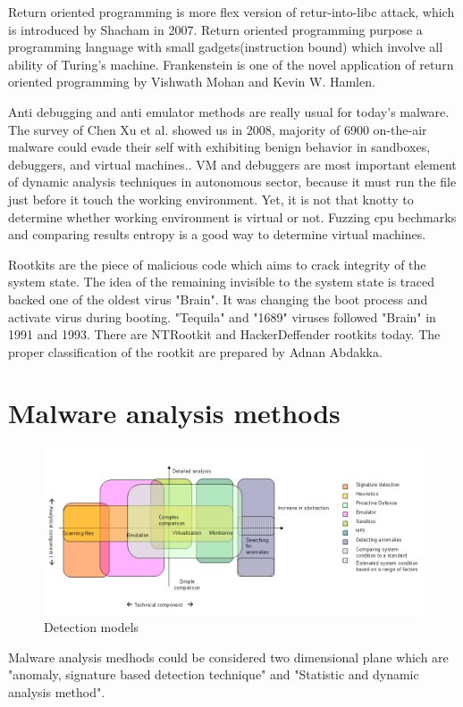 \documentclass[informationsecurity]{gucmasterproject}
\begin{document}
Return oriented programming is more flex version of retur-into-libc attack, which is introduced by Shacham in 2007\cite{shacham2007geometry}. Return oriented programming purpose a programming language with small gadgets(instruction bound) which involve all ability of Turing's machine\cite{roemer2012return}. Frankenstein is one of the novel application of return oriented programming by Vishwath Mohan and Kevin W. Hamlen\cite{mohan2012frankenstein}.

Anti debugging and anti emulator methods are really usual for today's malware. The survey of Chen Xu et al. showed us in 2008, majority of 6900 on-the-air malware could evade their self with exhibiting benign behavior in sandboxes, debuggers, and virtual machines.\cite{chen2008towards}. VM and debuggers are most important element of dynamic analysis techniques in autonomous sector, because it must run the file just before it touch the working environment. Yet, it is not that knotty to determine whether working environment is virtual or not. Fuzzing cpu bechmarks and comparing results entropy is a good way to determine virtual machines.\cite{franklin2008remote}

Rootkits are the piece of malicious code which aims to crack integrity of the system state. The idea of the remaining invisible to the system state is traced backed one of the oldest virus "Brain"\cite{martin2008}. It was changing the boot process and activate virus during booting. "Tequila" and "1689" viruses followed "Brain" in 1991 and 1993\cite{Ducklin1991}. There are NTRootkit and HackerDeffender rootkits today. The proper classification of the rootkit are prepared by Adnan Abdakka\cite{Adnan2011}.



\section{Malware analysis methods}

\begin{figure}[h]
    \centering
    \includegraphics[width=1\textwidth]{alisa_1007_pic1_en.jpg}
    \caption{Detection models \cite{Shevchenko2007detc}}
    \label{fig:awesome_image}
\end{figure}
Malware analysis medhods could be considered two dimensional plane which are "anomaly, signature based detection technique" and "Statistic and dynamic analysis method". 
\end{document}
